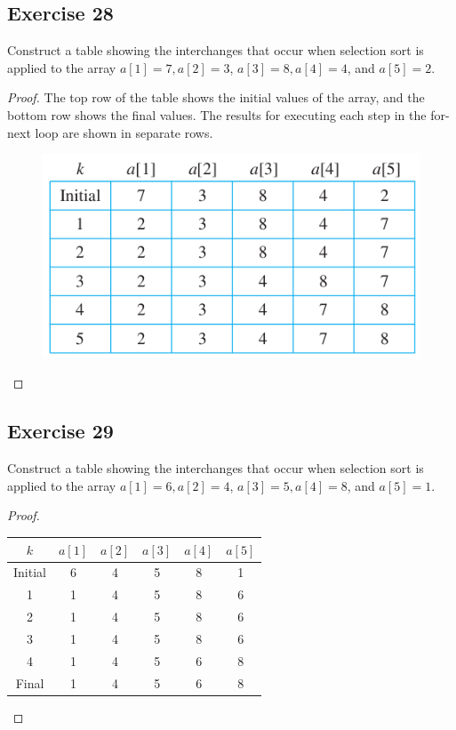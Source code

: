 \documentclass[14pt]{extarticle}
\begin{document}
\subsection{Exercise 28}
Construct a table showing the interchanges that occur when selection sort is applied to the array \(a[1] = 7, a[2] = 3\), 
\(a[3] = 8, a[4] = 4\), and \(a[5] = 2\).

\begin{proof}
The top row of the table shows the initial values of the array, and the bottom row shows the final values. The results 
for executing each step in the for-next loop are shown in separate rows.

\begin{figure}[ht!]
\centering
\includegraphics[scale=0.6]{../images/11.3.28.png}
\end{figure}
\end{proof}

\subsection{Exercise 29}
Construct a table showing the interchanges that occur when selection sort is applied to the array \(a[1] = 6, a[2] = 4\), 
\(a[3] = 5, a[4] = 8\), and \(a[5] = 1\).

\begin{proof}
\begin{center}
\begin{tabular}{|c|c|c|c|c|c|}
\hline
\(k\)& \(a[1]\) & \(a[2]\) & \(a[3]\) & \(a[4]\) & \(a[5]\) \\
\hline
Initial&6&4&5&8&1 \\
\hline
1&1&4&5&8&6 \\
\hline
2&1&4&5&8&6 \\
\hline
3&1&4&5&8&6 \\
\hline
4&1&4&5&6&8\\
\hline
Final&1&4&5&6&8\\
\hline
\end{tabular}
\end{center}
\end{proof}
\end{document}
